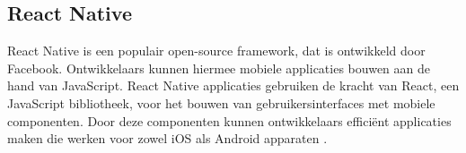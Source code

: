 \subsection{React Native}
\label{sec:react native}
React Native is een populair open-source framework, dat is ontwikkeld door Facebook. Ontwikkelaars kunnen hiermee mobiele applicaties bouwen aan de hand van JavaScript. React Native applicaties gebruiken de kracht van React, een JavaScript bibliotheek, voor het bouwen van gebruikersinterfaces met mobiele componenten. Door deze componenten kunnen ontwikkelaars efficiënt applicaties maken die werken voor zowel iOS als Android apparaten \autocite{Vinnik2021}.